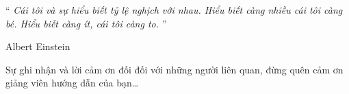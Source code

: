\documentclass[
12pt,
oneside,
english,
doublespacing,
nolistspacing,
liststotoc,
parskip,
headsepline,
chapterinoneline,
]{MastersDoctoralThesis}
\author{Tên sinh viên thực hiện} 			%
\begin{document}
\lstset{style=codeC}	%

\frontmatter 			%

\pagestyle{plain} 


%







\vspace*{0.2\textheight}

\noindent\enquote{\itshape 
	Cái tôi và sự hiểu biết tỷ lệ nghịch với nhau. Hiểu biết càng nhiều cái tôi càng bé. Hiểu biết càng ít, cái tôi càng to.
}\bigbreak

\hfill Albert Einstein



\begin{acknowledgements}
	\addchaptertocentry{\acknowledgementname}
	\thispagestyle{empty}
	Sự ghi nhận và lời cảm ơn đối đối với những người liên quan, đừng quên cảm ơn giảng viên hướng dẫn của bạn\ldots
\end{acknowledgements}


%

\begin{spacing}{1.15}
	\tableofcontents 	%
\end{spacing}

\begin{spacing}{1.15}
	\listoffigures 		%
\end{spacing}
\end{document}
